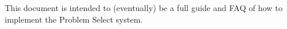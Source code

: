 \documentclass[handout]{ximera}
\begin{document}
This document is intended to (eventually) be a full guide and FAQ of how to implement the Problem Select system.
\end{document}
